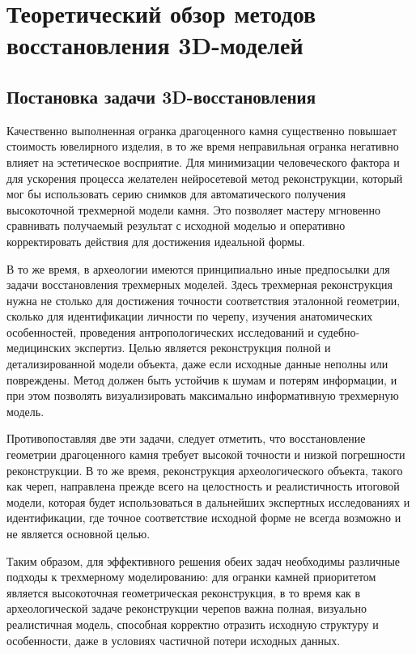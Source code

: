 \chapter{Теоретический обзор методов восстановления 3D-моделей}

\section{Постановка задачи 3D-восстановления}

Качественно выполненная огранка драгоценного камня существенно повышает
стоимость ювелирного изделия, в то же время неправильная огранка негативно
влияет на эстетическое восприятие. Для минимизации человеческого
фактора и для ускорения процесса желателен нейросетевой метод реконструкции,
который мог бы использовать серию снимков для автоматического получения
высокоточной трехмерной модели камня. Это позволяет мастеру мгновенно сравнивать
получаемый результат с исходной моделью и оперативно корректировать действия для
достижения идеальной формы.

В то же время, в археологии имеются принципиально иные предпосылки для задачи
восстановления трехмерных моделей. Здесь трехмерная реконструкция нужна не
столько для достижения точности соответствия эталонной геометрии, сколько для
идентификации личности по черепу, изучения анатомических особенностей,
проведения антропологических исследований и судебно-медицинских экспертиз. Целью
является реконструкция полной и детализированной модели объекта, даже если
исходные данные неполны или повреждены. Метод должен быть устойчив к шумам и
потерям информации, и при этом позволять визуализировать максимально
информативную трехмерную модель.

Противопоставляя две эти задачи, следует отметить, что восстановление геометрии
драгоценного камня требует высокой точности и низкой погрешности реконструкции. В то же
время, реконструкция археологического объекта, такого как череп, направлена
прежде всего на целостность и реалистичность итоговой модели, которая будет
использоваться в дальнейших экспертных исследованиях и идентификации, где точное
соответствие исходной форме не всегда возможно и не является основной целью.

Таким образом, для эффективного решения обеих задач необходимы различные подходы
к трехмерному моделированию: для огранки камней приоритетом является
высокоточная геометрическая реконструкция, в то время как в археологической
задаче реконструкции черепов важна полная, визуально реалистичная модель,
способная корректно отразить исходную структуру и особенности, даже в условиях
частичной потери исходных данных.

